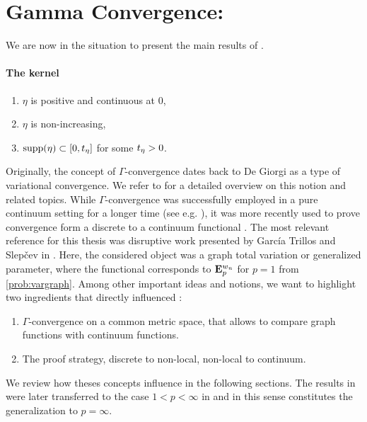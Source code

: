 \section{Gamma Convergence: \cite{roith2022continuum}}\label{sec:GConv}
We are now in the situation to present the main results of \cite{roith2022continuum, bungert2022ratio}. 
%
%
%
%
\paragraph{The kernel}

\begin{enumerate}[label=(K\upshape\arabic*)]
\item\label{en:K1} $\eta$ is positive and continuous at $0$,
\item\label{en:K2} $\eta$ is non-increasing,
\item\label{en:K4} $\mathrm{supp}(\eta) \subset [0,t_\eta]$ for some $t_\eta>0$.
\end{enumerate}
%
%
%
%
%
Originally, the concept of $\Gamma$-convergence dates back to De Giorgi \cite{de1975tipo} as a type of variational convergence. We refer to \cite{Brad02, dal2012introduction} for a detailed overview on this notion and related topics. While $\Gamma$-convergence was successfully employed in a pure continuum setting for a longer time (see e.g. \cite{modica1977esempio}), it was more recently used to prove convergence form a discrete to a continuum functional \cite{chambolle2010continuous, braides2012quantitative, van2012gamma}. The most relevant reference for this thesis was disruptive work presented by Garc\'ia Trillos and Slep\v{c}ev in \cite{GarcSlep15}. Here, the considered object was a graph total variation or generalized parameter, where the functional corresponds to $\mathbf{E}^{w_n}_p$ for $p=1$ from \cref{prob:vargraph}. Among other important ideas and notions, we want to highlight two ingredients that directly influenced \cite{roith2022continuum}:
%
\begin{enumerate}[label=\arabic*)]
\item $\Gamma$-convergence on a common metric space, that allows to compare graph functions with continuum functions.
\item The proof strategy, discrete to non-local, non-local to continuum.
\end{enumerate}
%
%
We review how theses concepts influence \cite{roith2022continuum} in the following sections. The results in \cite{GarcSlep15} were later transferred to the case $1<p<\infty$ in \cite{slepcev2019analysis} and in this sense \cite{roith2022continuum} constitutes the generalization to $p=\infty$. 
%
%
